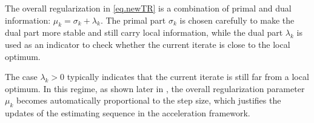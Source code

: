 \documentclass[moor,sglanonrev]{informs4}
\begin{document}
\begin{subroutine}[!ht]
    \small
    \caption{Local Detection (LD) }\label{alg.local detection}
    \begin{algorithmic}[1]
        \label{line.if coro 3.1}
        \ENDIF
        \label{line.track 1 number of iter}
        \ENDIF
        \ENDFOR
        \ELSE
        \ENDIF
        \ENDIF
        \ENDWHILE
    \end{algorithmic}
    \normalsize
\end{subroutine}
The overall regularization in \ref{eq.newTR} is a combination of primal and dual information: $\mu_k = \sigma_k + \lambda_k$. The primal part $\sigma_k$ is chosen carefully to make the dual part more stable and still carry local information, while the dual part $\lambda_k$ is used as an indicator to check whether the current iterate is close to the local optimum.


The case $\lambda_k > 0$ typically indicates that the current iterate is still far from a local optimum. In this regime, as shown later in , the overall regularization parameter $\mu_k$ becomes automatically proportional to the step size, which justifies the updates of the estimating sequence in the acceleration framework.
\end{document}
